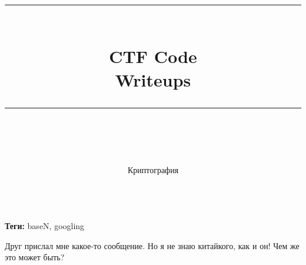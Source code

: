 \documentclass[idxtotoc,hyperref,openany,oneside]{files/crypto} %
\newcommand{\HRule}{\rule{\linewidth}{0.5mm}} %
\begin{document}

\frontmatter %
\title{
\begin{center}
\HRule \\[0.4cm]
{\Huge \bfseries CTF Code \\[0.5cm] \Large Writeups}\\[0.4cm] %
\HRule \\[1.5cm]
\end{center}
}
\author{\Huge Криптография \\ \\[2cm]} %
\maketitle

\tableofcontents

\mainmatter %












\textbf{Теги:} baseN, googling\vspace{\baselineskip}

\begin{tcolorbox}
Друг прислал мне какое-то сообщение. Но я не знаю китайкого, как и он! Чем же это может быть?
\end{tcolorbox}
\end{document}
